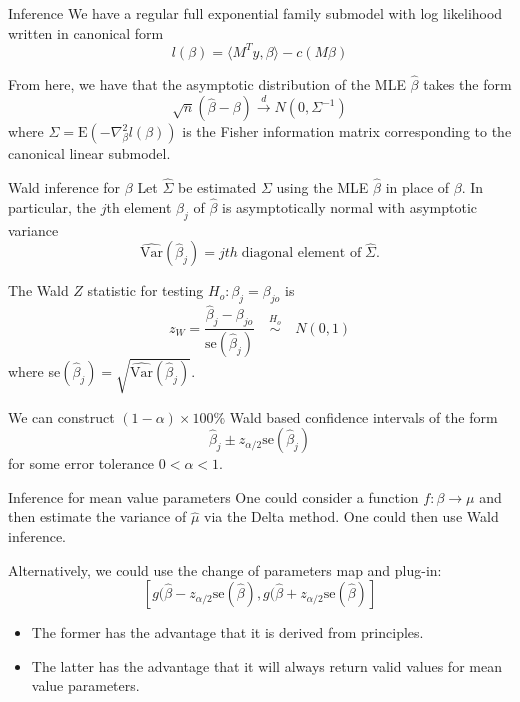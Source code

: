\documentclass[
  ignorenonframetext,
]{beamer}
\providecommand{\tightlist}{%
  \setlength{\itemsep}{0pt}\setlength{\parskip}{0pt}}
\begin{document}
\begin{frame}{Inference}
\protect\hypertarget{inference}{}
We have a regular full exponential family submodel with log likelihood
written in canonical form \[
    l(\beta) = \langle M^Ty,\beta \rangle - c(M\beta)
\]

From here, we have that the asymptotic distribution of the MLE
\(\hat\beta\) takes the form \[
  \sqrt{n}\left(\hat\beta - \beta\right) \overset{d}{\to} N(0, \Sigma^{-1})
\] where \(\Sigma = \text{E}\left(-\nabla_\beta^2 l(\beta)\right)\) is
the Fisher information matrix corresponding to the canonical linear
submodel.
\end{frame}

\begin{frame}{Wald inference for \(\beta\)}
\protect\hypertarget{wald-inference-for-beta}{}
Let \(\widehat\Sigma\) be estimated \(\Sigma\) using the MLE
\(\hat\beta\) in place of \(\beta\). In particular, the \(j\)th element
\(\hat\beta_j\) of \(\hat\beta\) is asymptotically normal with
asymptotic variance \[
  \widehat{\text{Var}}(\hat\beta_j) = jth \; \text{diagonal element of} \; \widehat\Sigma.
\]

\vspace*{12pt}

The Wald \(Z\) statistic for testing \(H_o:\beta_j = \beta_{jo}\) is \[
  z_W = \frac{\hat\beta_j - \beta_{jo}}{\text{se}(\hat\beta_j)} \quad \overset{H_o}{\sim} \quad N(0,1)
\] where se\((\hat\beta_j) = \sqrt{\widehat{\text{Var}}(\hat\beta_j)}\).
\end{frame}

\begin{frame}{}
\protect\hypertarget{section-8}{}
We can construct \((1-\alpha)\times 100\%\) Wald based confidence
intervals of the form \[
  \hat\beta_j \pm z_{\alpha/2}\text{se}(\hat\beta_j)
\] for some error tolerance \(0 < \alpha < 1\).
\end{frame}

\begin{frame}{Inference for mean value parameters}
\protect\hypertarget{inference-for-mean-value-parameters}{}
One could consider a function \(f:\beta\to\mu\) and then estimate the
variance of \(\hat{\mu}\) via the Delta method. One could then use Wald
inference.

\vspace{12pt}

Alternatively, we could use the change of parameters map and plug-in: \[
  \left[g(\hat\beta - z_{\alpha/2}\text{se}(\hat\beta), g(\hat\beta + z_{\alpha/2}\text{se}(\hat\beta) \right]
\]

\vspace{12pt}

\begin{itemize}
\tightlist
\item
  The former has the advantage that it is derived from principles.
\item
  The latter has the advantage that it will always return valid values
  for mean value parameters.
\end{itemize}
\end{frame}
\end{document}
